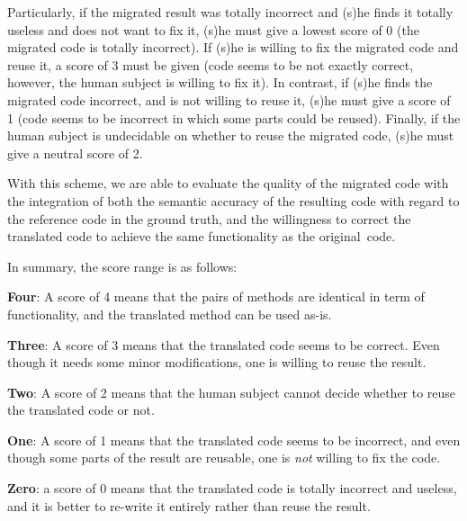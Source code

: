 %
Particularly, if the migrated result was totally incorrect and (s)he
finds it totally useless and does not want to fix it, (s)he must give
a lowest score of 0 (\ie the migrated code is totally incorrect).
%
If (s)he is willing to fix the migrated code and reuse it, a score of
3 must be given (code seems to be not exactly correct, however, the human
subject is willing to fix it). In contrast, if (s)he finds the
migrated code incorrect, and is not willing to reuse it, (s)he must
give a score of 1 (code seems to be incorrect in which some parts
could be reused). Finally, if the human subject is undecidable on
whether to reuse the migrated code, (s)he must give a neutral score of
2.

With this scheme, we are able to evaluate the quality of the migrated
code with the integration of both the semantic accuracy of the
resulting code with regard to the reference code in the ground truth,
and the willingness to correct the translated code to achieve the same
functionality as the original~code.


%

In summary, the score range is as follows:

\begin{compactitem}

\item {\bf Four}: A score of 4 means that the pairs of methods are
  identical in term of functionality, and the translated method can be
  used as-is.

\item {\bf Three}: A score of 3 means that the translated code seems to be
  correct. Even though it needs some minor modifications, one is
  willing to reuse the result.

\item {\bf Two}: A score of 2 means that the human subject cannot
  decide whether to reuse the translated code or not.

\item {\bf One}: A score of 1 means that the translated code seems to be
  incorrect, and even though some parts of the result are reusable,
  one is {\em not} willing to fix the code.

\item {\bf Zero}: a score of 0 means that the translated code is totally
  incorrect and useless, and it is better to re-write it entirely
  rather than reuse the result.

\end{compactitem}

